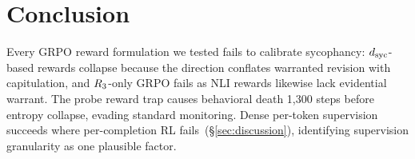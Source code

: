 \section{Conclusion}\label{sec:conclusion}

Every GRPO reward formulation we tested fails to calibrate sycophancy: $d_{\text{syc}}$-based rewards collapse because the direction conflates warranted revision with capitulation, and $R_3$-only GRPO fails as NLI rewards likewise lack evidential warrant.
The probe reward trap causes behavioral death 1{,}300 steps before entropy collapse, evading standard monitoring.
Dense per-token supervision succeeds where per-completion RL fails~(\S\ref{sec:discussion}), identifying supervision granularity as one plausible factor.
